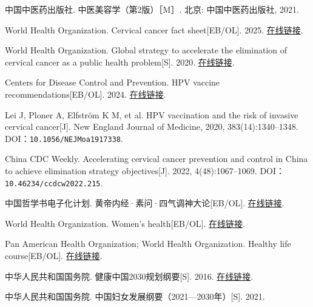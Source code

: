\begin{enumerate}[label={[Q\arabic*]},leftmargin=*]
  \item 中国中医药出版社. 中医美容学（第2版）［M］. 北京: 中国中医药出版社, 2021.
  \item World Health Organization. Cervical cancer fact sheet[EB/OL]. 2025. \href{https://www.who.int/news-room/fact-sheets/detail/cervical-cancer}{在线链接}.
  \item World Health Organization. Global strategy to accelerate the elimination of cervical cancer as a public health problem[S]. 2020. \href{https://www.who.int/publications/i/item/9789240014107}{在线链接}.
  \item Centers for Disease Control and Prevention. HPV vaccine recommendations[EB/OL]. 2024. \href{https://www.cdc.gov/hpv/hcp/vaccination-considerations/index.html}{在线链接}.
  \item Lei J, Ploner A, Elfström K M, et al. HPV vaccination and the risk of invasive cervical cancer[J]. New England Journal of Medicine, 2020, 383(14):1340–1348. DOI：\nolinkurl{10.1056/NEJMoa1917338}.
  \item China CDC Weekly. Accelerating cervical cancer prevention and control in China to achieve elimination strategy objectives[J]. 2022, 4(48):1067–1069. DOI：\nolinkurl{10.46234/ccdcw2022.215}.
  \item 中国哲学书电子化计划. 黄帝内经·素问·四气调神大论[EB/OL]. \href{https://ctext.org/huangdi-neijing/si-qi-diao-shen-da-lun/zhs}{在线链接}.
  \item World Health Organization. Women’s health[EB/OL]. \href{https://www.who.int/health-topics/women-s-health}{在线链接}.
  \item Pan American Health Organization; World Health Organization. Healthy life course[EB/OL]. \href{https://www.paho.org/en/topics/healthy-life-course}{在线链接}.
  \item 中华人民共和国国务院. 健康中国2030规划纲要[S]. 2016. \href{https://www.gov.cn/zhengce/2016-10/25/content_5124174.htm}{在线链接}.
  \item 中华人民共和国国务院. 中国妇女发展纲要（2021—2030年）[S]. 2021.
\end{enumerate}
